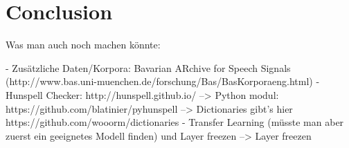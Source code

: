 \section{Conclusion}\label{conclusion}

Was man auch noch machen könnte:

- Zusätzliche Daten/Korpora: Bavarian ARchive for Speech Signals (http://www.bas.uni-muenchen.de/forschung/Bas/BasKorporaeng.html)
- Hunspell Checker: http://hunspell.github.io/
  --> Python modul: https://github.com/blatinier/pyhunspell
  --> Dictionaries gibt's hier https://github.com/wooorm/dictionaries
- Transfer Learning (müsste man aber zuerst ein geeignetes Modell finden) und Layer freezen
 --> Layer freezen